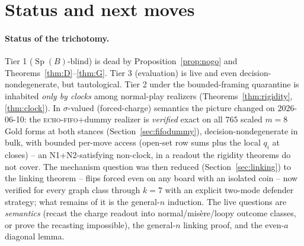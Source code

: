\documentclass[11pt]{article}
\theoremstyle{plain}
\theoremstyle{definition}
\newcommand{\Sp}{\operatorname{Sp}}
\begin{document}
\section{Status and next moves}\label{sec:status}

\paragraph{Status of the trichotomy.}
Tier 1 ($\Sp(B)$-blind) is dead by Proposition~\ref{prop:nogo} and
Theorems~\ref{thm:D}--\ref{thm:G}. Tier 3 (evaluation) is live and even
decision-nondegenerate, but tautological. Tier 2 under the bounded-framing
quarantine is inhabited \emph{only by clocks} among normal-play realizers
(Theorems~\ref{thm:rigidity}, \ref{thm:clock}). In $\sigma$-valued
(forced-charge) semantics the picture changed on 2026-06-10: the
\textsc{echo}-\textsc{fifo}+dummy realizer is \emph{verified} exact on all
$765$ scaled $m=8$ Gold forms at both stances
(Section~\ref{sec:fifodummy}), decision-nondegenerate in bulk, with
bounded per-move access (open-set row sums plus the local $q_i$ at closes)
-- an N1+N2-satisfying non-clock, in a readout the rigidity theorems do
not cover. The mechanism question was then reduced
(Section~\ref{sec:linking}) to the linking theorem -- flips forced even
on any board with an isolated coin -- now verified for every graph class
through $k=7$ with an explicit two-mode defender strategy; what remains
of it is the general-$n$ induction. The live questions are
\emph{semantics} (recast the charge readout into normal/misère/loopy
outcome classes, or prove the recasting impossible), the general-$n$
linking proof, and the even-$a$ diagonal lemma.
\end{document}
